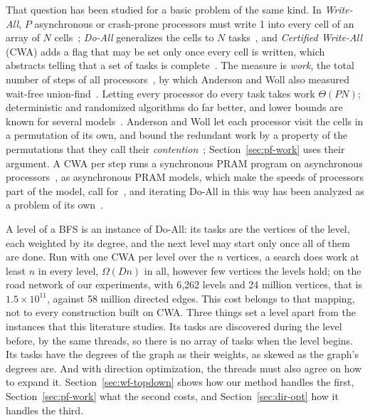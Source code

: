 That question has been studied for a basic problem of the same kind. In \emph{Write-All}, $P$ asynchronous or crash-prone processors must write 1 into every cell of an array of $N$ cells~\cite{kanellakis_robust}; \emph{Do-All} generalizes the cells to $N$ tasks~\cite{georgiou_doall}, and \emph{Certified Write-All} (CWA) adds a flag that may be set only once every cell is written, which abstracts telling that a set of tasks is complete~\cite{martel_cwa}. The measure is \emph{work}, the total number of steps of all processors~\cite{martel_apram}, by which Anderson and Woll also measured wait-free union-find~\cite{anderson_woll_uf}. Letting every processor do every task takes work $\Theta(PN)$; deterministic and randomized algorithms do far better, and lower bounds are known for several models~\cite{kanellakis_restartable, martel_cwa, anderson_woll_cwa, chlebus_writeall, kowalski_writeall}. Anderson and Woll let each processor visit the cells in a permutation of its own, and bound the redundant work by a property of the permutations that they call their \emph{contention}~\cite{anderson_woll_cwa}; Section~\ref{sec:pf-work} uses their argument. A CWA per step runs a synchronous PRAM program on asynchronous processors~\cite{martel_apram, kanellakis_book}, as asynchronous PRAM models, which make the speeds of processors part of the model, call for~\cite{cole_apram, gibbons_apram, nishimura_async}, and iterating Do-All in this way has been analyzed as a problem of its own~\cite{georgiou_iterative}.

A level of a BFS is an instance of Do-All: its tasks are the vertices of the level, each weighted by its degree, and the next level may start only once all of them are done. Run with one CWA per level over the $n$ vertices, a search does work at least $n$ in every level, $\Omega(Dn)$ in all, however few vertices the levels hold; on the road network of our experiments, with 6,262 levels and 24 million vertices, that is $1.5 \times 10^{11}$, against 58 million directed edges. This cost belongs to that mapping, not to every construction built on CWA. Three things set a level apart from the instances that this literature studies. Its tasks are discovered during the level before, by the same threads, so there is no array of tasks when the level begins. Its tasks have the degrees of the graph as their weights, as skewed as the graph's degrees are. And with direction optimization, the threads must also agree on how to expand it. Section~\ref{sec:wf-topdown} shows how our method handles the first, Section~\ref{sec:pf-work} what the second costs, and Section~\ref{sec:dir-opt} how it handles the third.

